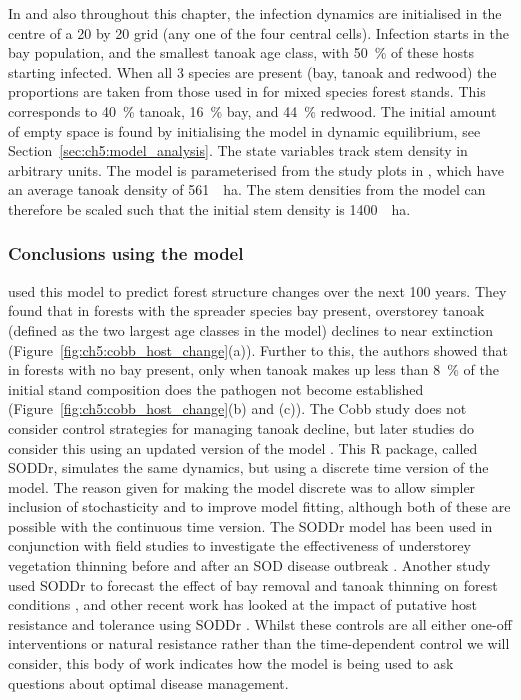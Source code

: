 In \citet{cobb_ecosystem_2012} and also throughout this chapter, the infection dynamics are initialised in the centre of a 20 by 20 grid (any one of the four central cells). Infection starts in the bay population, and the smallest tanoak age class, with \SI{50}{\percent} of these hosts starting infected. When all 3 species are present (bay, tanoak and redwood) the proportions are taken from those used in \citet{cobb_ecosystem_2012} for mixed species forest stands. This corresponds to \SI{40}{\percent} tanoak, \SI{16}{\percent} bay, and \SI{44}{\percent} redwood. The initial amount of empty space is found by initialising the model in dynamic equilibrium, see Section~\ref{sec:ch5:model_analysis}. The state variables track stem density in arbitrary units. The model is parameterised from the study plots in \citet{cobb_ecosystem_2012}, which have an average tanoak density of \SI{561}{\per\hectare}. The stem densities from the model can therefore be scaled such that the initial stem density is \SI{1400}{\per\hectare}.


\subsubsection{Conclusions using the model}

\citet{cobb_ecosystem_2012} used this model to predict forest structure changes over the next 100 years. They found that in forests with the spreader species bay present, overstorey tanoak (defined as the two largest age classes in the model) declines to near extinction (Figure~\ref{fig:ch5:cobb_host_change}(a)). Further to this, the authors showed that in forests with no bay present, only when tanoak makes up less than \SI{8}{\percent} of the initial stand composition does the pathogen not become established (Figure~\ref{fig:ch5:cobb_host_change}(b) and (c)). The Cobb study does not consider control strategies for managing tanoak decline, but later studies do consider this using an updated version of the model \citep{ross_soddr_2013}. This R package, called SODDr, simulates the same dynamics, but using a discrete time version of the model. The reason given for making the model discrete was to allow simpler inclusion of stochasticity and to improve model fitting, although both of these are possible with the continuous time version. The SODDr model has been used in conjunction with field studies to investigate the effectiveness of understorey vegetation thinning before and after an SOD disease outbreak \citep{cobb_resiliency_2017}. Another study used SODDr to forecast the effect of bay removal and tanoak thinning on forest conditions \citep{valachovic_forest_2017}, and other recent work has looked at the impact of putative host resistance and tolerance using SODDr \citep{cobb_promise_2019}. Whilst these controls are all either one-off interventions or natural resistance rather than the time-dependent control we will consider, this body of work indicates how the model is being used to ask questions about optimal disease management.

